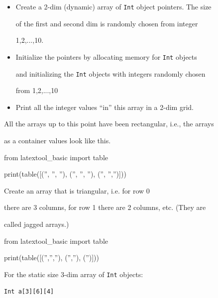 
\begin{itemize}

\item

  Create a 2-dim (dynamic) array of \texttt{Int} object pointers. The size

  of the first and second dim is randomly chosen from integer

  1,2,...,10.

\item

  Initialize the pointers by allocating memory for \texttt{Int} objects

  and initializing the \texttt{Int} objects with integers randomly chosen

  from 1,2,...,10

\item

  Print all the integer values ``in'' this array in a 2-dim grid.

\end{itemize}



All the arrays up to this point have been rectangular, i.e., the arrays

as a container values look like this.

\begin{python}

from latextool_basic import table

print(table([('', '', ''), ('', '', ''), ('', '','')]))

\end{python}

Create an array that is triangular, i.e. for row 0



there are 3 columns, for row 1 there are 2 columns, etc. (They are

called jagged arrays.)

\begin{python}

from latextool_basic import table

print(table([('','',''), ('',''), ('')]))

\end{python}

For the static size 3-dim array of \texttt{Int} objects:

\begin{center}

\texttt{Int a[3][6][4]}

\end{center}

